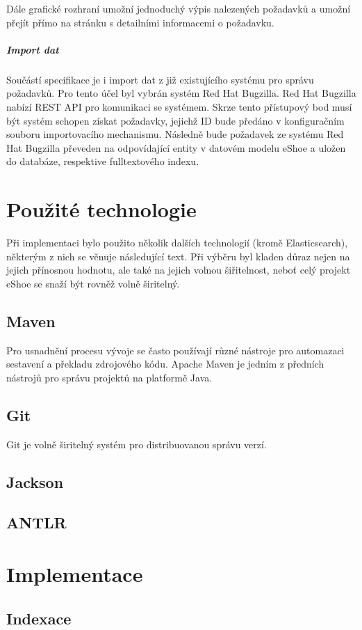 \documentclass[11pt,oneside]{fithesis2}
\begin{document}
Dále grafické rozhraní umožní jednoduchý výpis nalezených požadavků a umožní přejít přímo na stránku s detailními informacemi o požadavku.

\subparagraph{Import dat}
Součástí specifikace je i import dat z již existujícího systému pro správu požadavků. Pro tento účel byl vybrán systém Red Hat Bugzilla. Red Hat Bugzilla nabízí REST API pro komunikaci se systémem. Skrze tento přístupový bod musí být systém schopen získat požadavky, jejichž ID bude předáno v konfiguračním souboru importovacího mechanismu. Následně bude požadavek ze systému Red Hat Bugzilla převeden na odpovídající entity v datovém modelu eShoe a uložen do databáze, respektive fulltextového indexu.

\section{Použité technologie}
Při implementaci bylo použito několik dalších technologií (kromě Elasticsearch), některým z nich se věnuje následující text. Při výběru byl kladen důraz nejen na jejich přínosnou hodnotu, ale také na jejich volnou šiřitelnost, neboť celý projekt eShoe se snaží být rovněž volně širitelný.

\subsection{Maven}
Pro usnadnění procesu vývoje se často používají různé nástroje pro automazaci sestavení a překladu zdrojového kódu. Apache Maven je jedním z předních nástrojů pro správu projektů na platformě Java.

\subsection{Git}
Git je volně širitelný systém pro distribuovanou správu verzí. 
\subsection{Jackson}
\subsection{ANTLR}

\section{Implementace}

\subsection{Indexace}
\end{document}
